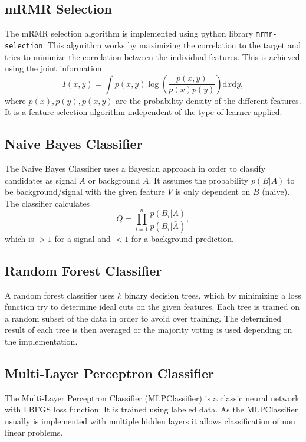 \subsection{mRMR Selection}
\label{sec:mRmR}
The mRMR selection algorithm is implemented using python library \texttt{mrmr-selection}. This algorithm works by maximizing the correlation to the target and tries to minimize the correlation between the individual features. This is achieved using the joint information 
\begin{equation*}
	I(x,y) = \int p(x,y)\log\left(\frac{p(x,y)}{p(x)p(y)}\right)\mathrm{d}x\mathrm{d}y,
\end{equation*}
where $p(x),p(y),p(x,y)$ are the probability density of the different features. It is a feature selection algorithm independent of the type of learner applied.

\subsection{Naive Bayes Classifier}
The Naive Bayes Classifier uses a Bayesian approach in order to classify candidates as signal $A$ or background $\bar{A}$. It assumes the probability $p(B|A)$ to be background/signal with the given feature $V$ is only dependent on $B$ (naive). The classifier calculates
\begin{equation*}
	Q = \prod_{i=1}^{n} \frac{p(B_i|A)}{p(B_i|\bar{A})},
\end{equation*}
which is $> 1$ for a signal and $< 1$ for a background prediction.

\subsection{Random Forest Classifier}
A random forest classifier uses $k$ binary decision trees, which by minimizing a loss function try to determine ideal cuts on the given features. Each tree is trained on a random subset of the data in order to avoid over training. The determined result of each tree is then averaged or the majority voting is used depending on the implementation. 

\subsection{Multi-Layer Perceptron Classifier}
The Multi-Layer Perceptron Classifier (MLPClassifier) is a classic neural network with LBFGS loss function. It is trained using labeled data. As the MLPClassifier usually is implemented with multiple hidden layers it allows classification of non linear problems.

